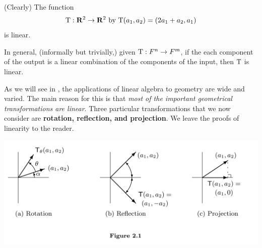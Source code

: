 \begin{example} \label{example 2.1.1}
(Clearly) The function
\[
    \mathrm{T} : \mathbf{R}^2 \to \mathbf{R}^2 \text{ by } \mathrm{T}(a_1, a_2) = (2 a_1 + a_2, a_1)
\]
is linear.
\end{example}

\begin{remark} \label{remark 2.1.3}
In general, (informally but trivially,) given \(\mathrm{T} : F^n \to F^m\), if the each component of the output is a linear combination of the components of the input, then \(\mathrm{T}\) is linear.
\end{remark}

\begin{note}
As we will see in , the applications of linear algebra to geometry are wide and varied.
The main reason for this is that \emph{most of the important geometrical transformations are linear}.
Three particular transformations that we now consider are \textbf{rotation, reflection, and projection}.
We leave the proofs of linearity to the reader.
\end{note}

\includegraphics[width=16cm]{images/figure-2-1.png}

